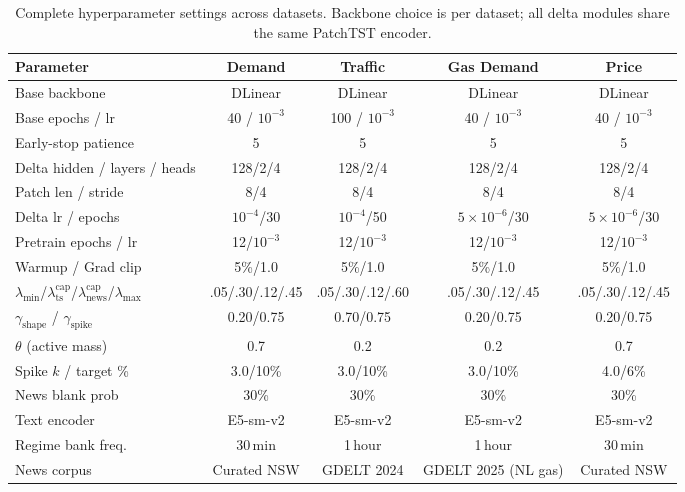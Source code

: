 \documentclass{article}
\begin{document}
\begin{table}[h]
    \centering
    \setlength{\tabcolsep}{7pt}
    \renewcommand{\arraystretch}{1.05}
    \caption{Complete hyperparameter settings across datasets. Backbone choice is per dataset; all delta modules share the same PatchTST encoder.}
    \label{tab:hyperparams}
    \scriptsize
    \begin{tabular}{lcccc}
        \toprule
        \textbf{Parameter} & \textbf{Demand} & \textbf{Traffic} & \textbf{Gas Demand} & \textbf{Price} \\
        \midrule
        Base backbone & DLinear & DLinear & DLinear & DLinear \\
        Base epochs / lr & 40 / $10^{-3}$ & 100 / $10^{-3}$ & 40 / $10^{-3}$ & 40 / $10^{-3}$ \\
        Early-stop patience & 5 & 5 & 5 & 5 \\
        \midrule
        Delta hidden / layers / heads & 128/2/4 & 128/2/4 & 128/2/4 & 128/2/4 \\
        Patch len / stride & 8/4 & 8/4 & 8/4 & 8/4 \\
        Delta lr / epochs & $10^{-4}$/30 & $10^{-4}$/50 & $5{\times}10^{-6}$/30 & $5{\times}10^{-6}$/30 \\
        Pretrain epochs / lr & 12/$10^{-3}$ & 12/$10^{-3}$ & 12/$10^{-3}$ & 12/$10^{-3}$ \\
        Warmup / Grad clip & 5\%/1.0 & 5\%/1.0 & 5\%/1.0 & 5\%/1.0 \\
        \midrule
        $\lambda_{\min}$/$\lambda_{\text{ts}}^{\text{cap}}$/$\lambda_{\text{news}}^{\text{cap}}$/$\lambda_{\max}$ & .05/.30/.12/.45 & .05/.30/.12/.60 & .05/.30/.12/.45 & .05/.30/.12/.45 \\
        $\gamma_{\text{shape}}$ / $\gamma_{\text{spike}}$ & 0.20/0.75 & 0.70/0.75 & 0.20/0.75 & 0.20/0.75 \\
        $\theta$ (active mass) & 0.7 & 0.2 & 0.2 & 0.7 \\
        Spike $k$ / target \% & 3.0/10\% & 3.0/10\% & 3.0/10\% & 4.0/6\% \\
        News blank prob & 30\% & 30\% & 30\% & 30\% \\
        Text encoder & E5-sm-v2 & E5-sm-v2 & E5-sm-v2 & E5-sm-v2 \\
        Regime bank freq. & 30\,min & 1\,hour & 1\,hour & 30\,min \\
        News corpus & Curated NSW & GDELT 2024 & GDELT 2025 (NL gas) & Curated NSW \\
        \bottomrule
    \end{tabular}
\end{table}
\end{document}
